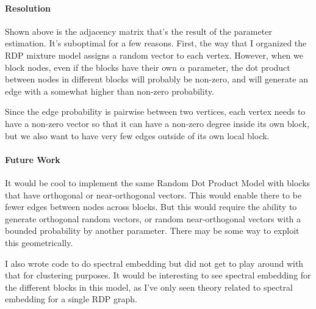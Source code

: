 \documentclass[12pt]{article}
\begin{document}
\paragraph{Resolution}
Shown above is the adjacency matrix that's the result of the parameter
estimation.  It's suboptimal for a few reasons.  First, the way that I organized
the RDP mixture model assigns a random vector to each vertex.  However, when we
block nodes, even if the blocks have their own $\alpha$ parameter, the dot
product between nodes in different blocks will probably be non-zero, and will
generate an edge with a somewhat higher than non-zero probability.

Since the edge probability is pairwise between two vertices, each vertex needs
to have a non-zero vector so that it can have a non-zero degree inside its own
block, but we also want to have very few edges outside of its own local block.

\paragraph{Future Work}
It would be cool to implement the same Random Dot Product Model with blocks that
have orthogonal or near-orthogonal vectors.  This would enable there to be fewer
edges between nodes across blocks.  But this would require the ability to
generate orthogonal random vectors, or random near-orthogonal vectors with a
bounded probability by another parameter.  There may be some way to exploit this
geometrically.

I also wrote code to do spectral embedding but did not get to play around with
that for clustering purposes.  It would be interesting to see spectral
embedding for the different blocks in this model, as I've only seen theory
related to spectral embedding for a single RDP graph.

\newpage



\end{document}

